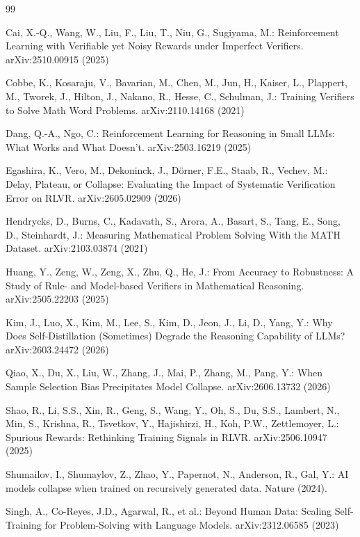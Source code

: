 \documentclass[runningheads]{llncs}
\begin{document}
\begin{thebibliography}{99}

Cai, X.-Q., Wang, W., Liu, F., Liu, T., Niu, G., Sugiyama, M.:
Reinforcement Learning with Verifiable yet Noisy Rewards under Imperfect
Verifiers. arXiv:2510.00915 (2025)

Cobbe, K., Kosaraju, V., Bavarian, M., Chen, M., Jun, H., Kaiser, L.,
Plappert, M., Tworek, J., Hilton, J., Nakano, R., Hesse, C., Schulman, J.:
Training Verifiers to Solve Math Word Problems. arXiv:2110.14168 (2021)

Dang, Q.-A., Ngo, C.: Reinforcement Learning for Reasoning in Small LLMs: What
Works and What Doesn't. arXiv:2503.16219 (2025)

Egashira, K., Vero, M., Dekoninck, J., D\"orner, F.E., Staab, R., Vechev,
M.: Delay, Plateau, or Collapse: Evaluating the Impact of Systematic
Verification Error on RLVR. arXiv:2605.02909 (2026)

Hendrycks, D., Burns, C., Kadavath, S., Arora, A., Basart, S., Tang, E.,
Song, D., Steinhardt, J.: Measuring Mathematical Problem Solving With the
MATH Dataset. arXiv:2103.03874 (2021)

Huang, Y., Zeng, W., Zeng, X., Zhu, Q., He, J.: From Accuracy to
Robustness: A Study of Rule- and Model-based Verifiers in Mathematical
Reasoning. arXiv:2505.22203 (2025)

Kim, J., Luo, X., Kim, M., Lee, S., Kim, D., Jeon, J., Li, D., Yang, Y.:
Why Does Self-Distillation (Sometimes) Degrade the Reasoning Capability of
LLMs? arXiv:2603.24472 (2026)

Qiao, X., Du, X., Liu, W., Zhang, J., Mai, P., Zhang, M., Pang, Y.:
When Sample Selection Bias Precipitates Model Collapse. arXiv:2606.13732
(2026)

Shao, R., Li, S.S., Xin, R., Geng, S., Wang, Y., Oh, S., Du, S.S., Lambert,
N., Min, S., Krishna, R., Tsvetkov, Y., Hajishirzi, H., Koh, P.W.,
Zettlemoyer, L.: Spurious Rewards: Rethinking Training Signals in RLVR.
arXiv:2506.10947 (2025)

Shumailov, I., Shumaylov, Z., Zhao, Y., Papernot, N., Anderson, R., Gal,
Y.: AI models collapse when trained on recursively generated data. Nature
(2024). 

Singh, A., Co-Reyes, J.D., Agarwal, R., et al.: Beyond Human Data: Scaling
Self-Training for Problem-Solving with Language Models. arXiv:2312.06585
(2023)


\end{thebibliography}
\end{document}
